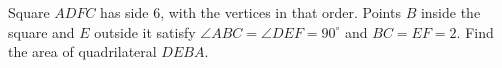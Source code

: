 Square $ADFC$ has side $6$, with the vertices in that order. Points $B$ inside the square and $E$ outside it satisfy $\angle ABC=\angle DEF=90^\circ$ and $BC=EF=2$. Find the area of quadrilateral $DEBA$.
